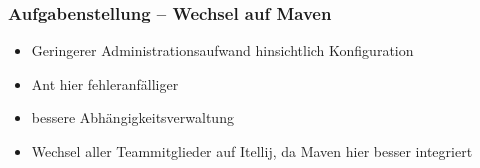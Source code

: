 \begin{frame}
\frametitle{Aufgabenstellung -- Wechsel auf Maven}
\begin{block}{\vspace*{-3ex}}
	\begin{itemize}
		\item Geringerer Administrationsaufwand hinsichtlich Konfiguration
		\item Ant hier fehleranfälliger
		\item bessere Abhängigkeitsverwaltung 
		\item[\color{black}{$\Rightarrow$}] Wechsel aller Teammitglieder auf Itellij, da Maven hier besser integriert
	\end{itemize}
\end{block}
\end{frame}